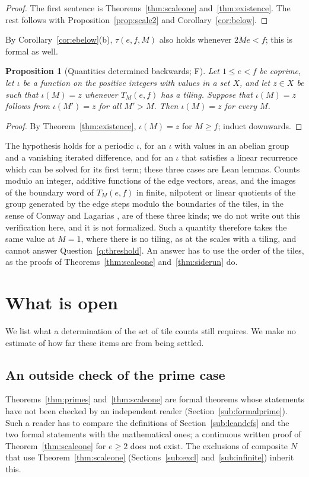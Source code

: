 \documentclass[11pt,reqno]{amsart}
\theoremstyle{plain}
\newtheorem{proposition}[theorem]{Proposition}
\theoremstyle{definition}
\newcommand{\sF}{\textup{\textsf{F}}}
\begin{document}
\begin{proof}
The first sentence is Theorems~\ref{thm:scaleone} and~\ref{thm:existence}. The rest follows with
Proposition~\ref{prop:scale2} and Corollary~\ref{cor:below}.
\end{proof}

By Corollary~\ref{cor:ebelow}\textup{(b)}, $\tau(e,f,M)$ also holds whenever $2Me<f$; this is formal as well.

\begin{proposition}[Quantities determined backwards; \sF]\label{prop:blind}
Let $1\le e<f$ be coprime, let $\iota$ be a function on the positive integers with values in a set $X$, and
let $z\in X$ be such that $\iota(M)=z$ whenever $T_M(e,f)$ has a tiling. Suppose that $\iota(M)=z$ follows
from $\iota(M')=z$ for all $M'>M$. Then $\iota(M)=z$ for every $M$.
\end{proposition}

\begin{proof}
By Theorem~\ref{thm:existence}, $\iota(M)=z$ for $M\ge f$; induct downwards.
\end{proof}

The hypothesis holds for a periodic $\iota$, for an $\iota$ with values in an abelian group and a vanishing
iterated difference, and for an $\iota$ that satisfies a linear recurrence which can be solved for its first
term; these three cases are Lean lemmas. Counts modulo an integer, additive functions of the edge vectors,
areas, and the images of the boundary word of $T_M(e,f)$ in finite, nilpotent or linear quotients of the
group generated by the edge steps modulo the boundaries of the tiles, in the sense of Conway and Lagarias
\cite{ConwayLagarias}, are of these three kinds; we do not write out this verification here, and it is not formalized. Such a quantity therefore takes the same value at
$M=1$, where there is no tiling, as at the scales with a tiling, and cannot answer
Question~\ref{q:threshold}. An answer has to use the order of the tiles, as the proofs of
Theorems~\ref{thm:scaleone} and~\ref{thm:siderun} do.

\section{What is open}\label{sec:open}

We list what a determination of the set of tile counts still requires. We make no estimate of how far these
items are from being settled.

\subsection{An outside check of the prime case}
Theorems~\ref{thm:primes} and~\ref{thm:scaleone} are formal theorems whose statements have not been
checked by an independent reader (Section~\ref{sub:formalprime}). Such a reader has to compare the definitions of
Section~\ref{sub:leandefs} and the two formal statements with the mathematical ones; a continuous written
proof of Theorem~\ref{thm:scaleone} for $e\ge2$ does not exist. The exclusions of composite $N$ that use
Theorem~\ref{thm:scaleone} (Sections~\ref{sub:excl} and~\ref{sub:infinite}) inherit this.
\end{document}
